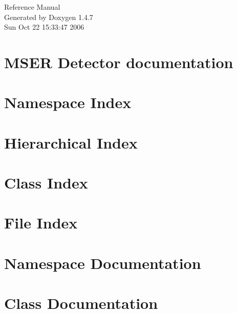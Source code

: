 \documentclass[a4paper]{book}
\begin{document}
\begin{titlepage}
\vspace*{7cm}
\begin{center}
{\Large Reference Manual}\\
\vspace*{1cm}
{\large Generated by Doxygen 1.4.7}\\
\vspace*{0.5cm}
{\small Sun Oct 22 15:33:47 2006}\\
\end{center}
\end{titlepage}
\clearemptydoublepage
{}
\tableofcontents
\clearemptydoublepage
{}
\chapter{MSER Detector documentation }
\label{index}\hypertarget{index}{}
\chapter{Namespace Index}

\chapter{Hierarchical Index}

\chapter{Class Index}

\chapter{File Index}

\chapter{Namespace Documentation}



\chapter{Class Documentation}

























\end{document}
